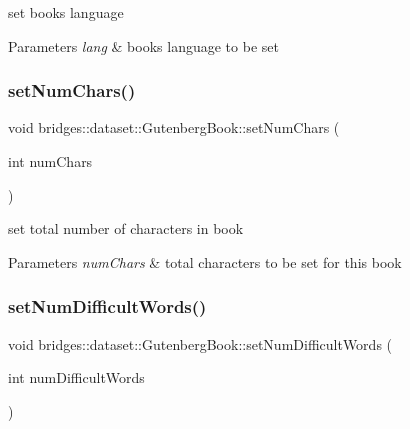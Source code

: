 set book\textquotesingle{}s language 
\begin{DoxyParams}{Parameters}
{\em lang} & book\textquotesingle{}s language to be set \\
\hline
\end{DoxyParams}
\mbox{\label{classbridges_1_1dataset_1_1_gutenberg_book_a5e4ccbb36137567c4b28accf83300920}} 
\subsubsection{\texorpdfstring{set\+Num\+Chars()}{setNumChars()}}
{\footnotesize\ttfamily void bridges\+::dataset\+::\+Gutenberg\+Book\+::set\+Num\+Chars (\begin{DoxyParamCaption}\item[{int}]{num\+Chars }\end{DoxyParamCaption})\hspace{0.3cm}{\ttfamily [inline]}}

set total number of characters in book 
\begin{DoxyParams}{Parameters}
{\em num\+Chars} & total characters to be set for this book \\
\hline
\end{DoxyParams}
\mbox{\label{classbridges_1_1dataset_1_1_gutenberg_book_a1cf0c2c558c414b1f5cfc04d00ae9128}} 
\subsubsection{\texorpdfstring{set\+Num\+Difficult\+Words()}{setNumDifficultWords()}}
{\footnotesize\ttfamily void bridges\+::dataset\+::\+Gutenberg\+Book\+::set\+Num\+Difficult\+Words (\begin{DoxyParamCaption}\item[{int}]{num\+Difficult\+Words }\end{DoxyParamCaption})\hspace{0.3cm}{\ttfamily [inline]}}


